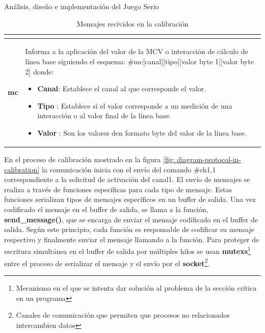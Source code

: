 \begin{thesischapter}{2} {Análisis, diseño e implementación del Juego Serio}
\begin{table}[ht]
\begin{tabular}{ |c|p{14cm}|}
\begin{minipage}{14cm}
\begin{itemize}
                                \end{itemize}
                                \vspace{1pt}
                            \end{minipage}\\\hline 
        \textbf{mc}     &   \begin{minipage}{14cm}
                                \vspace{1pt}
                                Informa a la aplicación del valor de la MCV o interacción de cálculo de línea base siguiendo el esquema: \#mc[canal][tipo][valor byte 1][valor byte 2] donde:
                                \begin{itemize}
                                    \item \textbf{Canal}: Establece el canal al que corresponde el valor.
                                    \item \textbf{Tipo} : Establece si el valor corresponde a un medición de una interacción o al valor final de la línea base.
                                    \item \textbf{Valor} : Son los valores den formato byte del valor de la línea base.  
                                \end{itemize}
                                \vspace{1pt}
                            \end{minipage} \\\hline                        
    \end{tabular}
    \caption{Mensajes recividos en la calibración}
    \label{table:recive-msg-in-calibration}
\end{table} 


\newpage
{}
En el proceso de calibración mostrado en la figura \ref{fig: diagram-protocol-in-calibration}  la comunicación inicia con el envío del comando \#ch1,1 correspondiente a la solicitud de activación  del canal1. El envío de mensajes se realiza  a través de funciones específicas para cada tipo de mensaje. Estas funciones serializan tipos de mensajes específicos en un buffer de salida. Una vez codificado el mensaje en el buffer de salida, se llama a la función, \textbf{send\_message()}, que se encarga de enviar el mensaje codificado en el buffer de salida. Según este principio, cada función es responsable de codificar su mensaje respectivo y finalmente enviar el mensaje llamando a la función. Para proteger de escritura simultánea en el buffer de salida por múltiples hilos se usan \textbf{mutexs}\footnote{Mecanismo en el que se intenta dar solución al problema de la sección crítica en un programa} entre el
proceso de serializar el mensaje y el envío por el {\textbf{socket}}\footnote{Canales de comunicación que permiten que procesos no relacionados intercambien datos}. 
    

\end{thesischapter}
